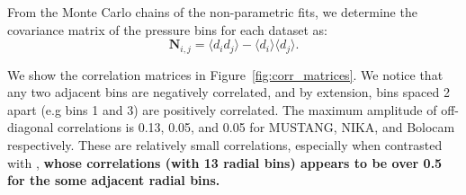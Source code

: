 \documentclass[twocolumn,traditabstract]{aa}
\begin{document}

From the Monte Carlo chains of the non-parametric fits, we determine the covariance matrix of the pressure bins for each dataset as:
\begin{equation}
  \mathbf{N}_{i,j} = \langle d_i d_j \rangle - \langle d_i \rangle \langle d_j \rangle.
  \label{eqn:covariance}
\end{equation}

We show the correlation matrices in Figure~\ref{fig:corr_matrices}. We notice
that any two adjacent bins are negatively correlated, and by extension, bins spaced 2 apart (e.g bins 1 and 3) are positively
correlated. The maximum amplitude of off-diagonal correlations is 0.13, 0.05, and 0.05 for MUSTANG, NIKA, and Bolocam respectively.
These are relatively small correlations, especially when contrasted with \citet{sayers2013}, \textbf{whose correlations (with 13 radial bins)
appears to be over 0.5 for the some adjacent radial bins.}
\end{document}
